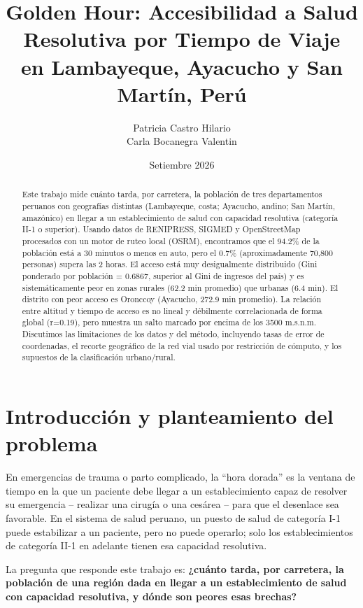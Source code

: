 \documentclass[11pt,a4paper]{article}
\title{Golden Hour: Accesibilidad a Salud Resolutiva por Tiempo de Viaje\\
en Lambayeque, Ayacucho y San Martín, Perú}
\author{Patricia Castro Hilario \\ Carla Bocanegra Valentin}
\date{Setiembre 2026}
\begin{document}
\maketitle

\begin{abstract}
Este trabajo mide cuánto tarda, por carretera, la población de tres departamentos
peruanos con geografías distintas (Lambayeque, costa; Ayacucho, andino; San Martín,
amazónico) en llegar a un establecimiento de salud con capacidad resolutiva
(categoría II-1 o superior). Usando datos de RENIPRESS, SIGMED y OpenStreetMap
procesados con un motor de ruteo local (OSRM), encontramos que el 94.2\% de la
población está a 30 minutos o menos en auto, pero el 0.7\% (aproximadamente 70,800
personas) supera las 2 horas. El acceso está muy desigualmente distribuido
(Gini ponderado por población = 0.6867, superior al Gini de ingresos del país) y
es sistemáticamente peor en zonas rurales (62.2 min promedio) que urbanas
(6.4 min). El distrito con peor acceso es Oronccoy (Ayacucho, 272.9 min promedio).
La relación entre altitud y tiempo de acceso es no lineal y débilmente
correlacionada de forma global (r=0.19), pero muestra un salto marcado por
encima de los 3500 m.s.n.m. Discutimos las limitaciones de los datos y del
método, incluyendo tasas de error de coordenadas, el recorte geográfico de la
red vial usado por restricción de cómputo, y los supuestos de la clasificación
urbano/rural.
\end{abstract}

\newpage
\tableofcontents
\newpage

\section{Introducción y planteamiento del problema}

En emergencias de trauma o parto complicado, la ``hora dorada'' es la ventana de
tiempo en la que un paciente debe llegar a un establecimiento capaz de resolver
su emergencia -- realizar una cirugía o una cesárea -- para que el desenlace sea
favorable. En el sistema de salud peruano, un puesto de salud de categoría I-1
puede estabilizar a un paciente, pero no puede operarlo; solo los establecimientos
de categoría II-1 en adelante tienen esa capacidad resolutiva.

La pregunta que responde este trabajo es: \textbf{¿cuánto tarda, por carretera, la
población de una región dada en llegar a un establecimiento de salud con
capacidad resolutiva, y dónde son peores esas brechas?}
\end{document}
